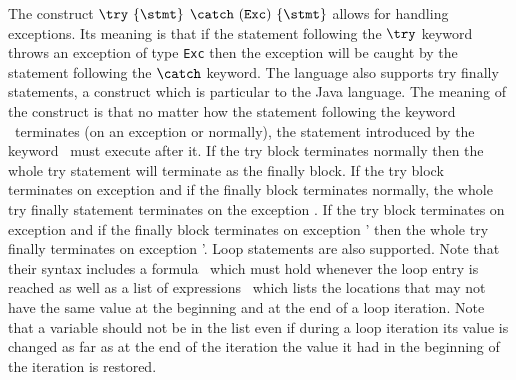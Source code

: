   The construct  $ \try  \ \{ \stmt \} $ $ \catch \ (\mbox{\rm\texttt{Exc}})\ \{ \stmt \}  $  allows for handling exceptions.
  Its meaning is that if the statement following the $ \try $ keyword throws an exception of type \texttt{Exc} then
  the exception will be caught by the statement following the  $ \catch $ keyword. The language also supports 
  try finally statements, a construct which is particular to the Java language.
  The meaning of the construct is that  no matter how the statement following the keyword \try \ terminates (on an exception or normally),
  the statement introduced by the keyword \finally \ must execute after it. If the try block terminates normally then the
  whole try statement will terminate as the finally block. If the try block terminates on exception \Exc{} and if the finally block
  terminates normally, the whole try finally statement terminates  on the exception  \Exc{}.  If the try block terminates on exception \Exc{} and if the finally block
  terminates on exception \Exc' then the whole try finally  terminates on exception \Exc'.
  Loop statements are also supported.  Note that their syntax includes  a formula \invariant \ which must hold whenever 
  the loop entry is reached as well as a  list of expressions
  \modLoop \ which lists the locations that  may not have the same value at the beginning
  and at the end of a loop iteration. Note that a  variable should not be in the list \modLoop{} even if during a loop iteration its value is changed
  as far as at the end of the iteration the value it had in the beginning of the iteration is restored.

